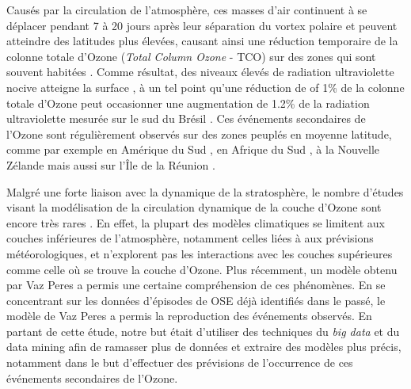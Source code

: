 Causés par la circulation de l'atmosphère, ces masses d'air continuent à se déplacer pendant 7 à 20 jours après leur séparation du vortex polaire et peuvent atteindre des latitudes plus élevées, causant ainsi une réduction temporaire de la colonne totale d'Ozone (\textit{Total Column Ozone} - TCO) sur des zones qui sont souvent habitées \cite{Prather1990}\cite{Waugh1994}\cite{Manney1994}. Comme résultat, des niveaux élevés de radiation ultraviolette nocive atteigne la surface \cite{Casiccia2008}, à un tel point qu'une réduction de of 1\% de la colonne totale d'Ozone peut occasionner une augmentation de 1.2\% de la radiation ultraviolette mesurée sur le sud du Brésil \cite{Guarnieri2004}. Ces événements secondaires de l'Ozone sont régulièrement observés sur des zones peuplés en moyenne latitude, comme par exemple en Amérique du Sud \cite{Kirschhoff1996}\cite{Pinheiro2011}, en Afrique du Sud \cite{Semane2006}\cite{Sivakumar2007}, à la Nouvelle Zélande \cite{Brinksma1998} mais aussi sur l'Île de la Réunion \cite{toihir2015}. 


Malgré une forte liaison avec la dynamique de la stratosphère, le nombre d'études visant la modélisation de la circulation dynamique de la couche d'Ozone sont encore très rares \cite{Marchand2005}. En effet, la plupart des modèles climatiques se limitent aux couches inférieures de l'atmosphère, notamment celles liées à aux prévisions météorologiques, et n'explorent pas les interactions avec les couches supérieures comme celle où se trouve la couche d'Ozone. Plus récemment, un modèle obtenu par Vaz Peres \cite{Peres2013} a permis une certaine compréhension de ces phénomènes. En se concentrant sur les données d'épisodes de OSE déjà identifiés dans le passé, le modèle de Vaz Peres a permis la reproduction des événements observés. En partant de cette étude, notre but était d'utiliser des techniques du \textit{big data} et du data mining afin de ramasser plus de données et extraire des modèles plus précis, notamment dans le but d'effectuer des prévisions de l'occurrence de ces événements secondaires de l'Ozone.

